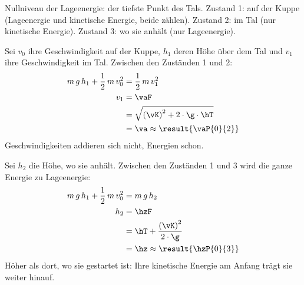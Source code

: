 Nullniveau der Lageenergie: der tiefste Punkt des Tals. Zustand 1: auf der Kuppe (Lageenergie und kinetische Energie, beide zählen). Zustand 2: im Tal (nur kinetische Energie). Zustand 3: wo sie anhält (nur Lageenergie).

\begin{abcliste}
\abc
Sei $v_0$ ihre Geschwindigkeit auf der Kuppe, $h_1$ deren Höhe über dem Tal und $v_1$ ihre Geschwindigkeit im Tal. Zwischen den Zuständen 1 und 2:
\begin{align}
 m\,g\,h_1 + \frac{1}{2}\,m\,v_0^2 &= \frac{1}{2}\,m\,v_1^2 \\
 v_1 &= \vaF \\
   &= \sqrt{\left(\vK\right)^2+2\cdot\g\cdot\hT} \\
   &= \va \approx \result{\vaP{0}{2}}
\end{align}
Geschwindigkeiten addieren sich nicht, Energien schon.

\abc
Sei $h_2$ die Höhe, wo sie anhält. Zwischen den Zuständen 1 und 3 wird die ganze Energie zu Lageenergie:
\begin{align}
 m\,g\,h_1 + \frac{1}{2}\,m\,v_0^2 &= m\,g\,h_2 \\
 h_2 &= \hzF \\
   &= \hT+\frac{\left(\vK\right)^2}{2\cdot\g} \\
   &= \hz \approx \result{\hzP{0}{3}}
\end{align}
Höher als dort, wo sie gestartet ist: Ihre kinetische Energie am Anfang trägt sie weiter hinauf.
\end{abcliste}
